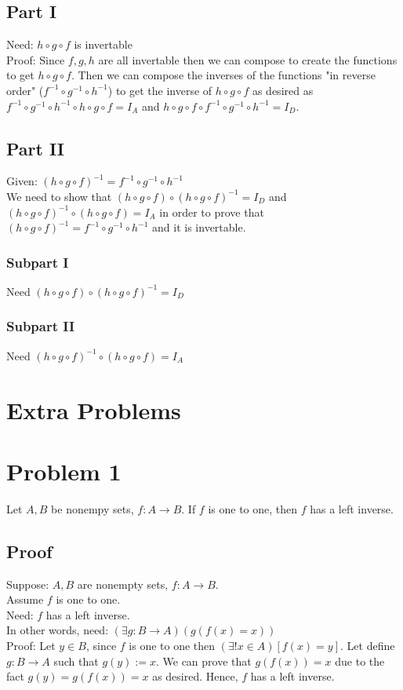\documentclass{article}
\begin{document}
\subsection*{Part I}
Need: $h \circ g \circ f$ is invertable\\
Proof: Since $f, g, h$ are all invertable then we can compose to create the functions to get $h \circ g \circ f$. Then we can compose the inverses of the functions "in reverse order" ($f^{-1} \circ g^{-1} \circ h^{-1}$) to get the inverse of $h \circ g \circ f$ as desired as $f^{-1} \circ g^{-1} \circ h^{-1} \circ h \circ g \circ f = I_A$ and $h \circ g \circ f \circ f^{-1} \circ g^{-1} \circ h^{-1} = I_D$.
\subsection*{Part II}
Given: $(h \circ g \circ f)^{-1} = f^{-1} \circ g^{-1} \circ h^{-1}$\\
We need to show that $(h \circ g \circ f) \circ (h \circ g \circ f)^{-1} = I_D$ and $(h \circ g \circ f)^{-1} \circ (h \circ g \circ f) = I_A$ in order to prove that $(h \circ g \circ f)^{-1} = f^{-1} \circ g^{-1} \circ h^{-1}$ and it is invertable.

\subsubsection*{Subpart I}
Need $(h \circ g \circ f) \circ (h \circ g \circ f)^{-1} = I_D$\\

\subsubsection*{Subpart II}
Need $(h \circ g \circ f)^{-1} \circ (h \circ g \circ f) = I_A$\\




\section*{Extra Problems}
\section*{Problem 1}
Let $A,B$ be nonempy sets, $f:A \rightarrow B$. If $f$ is one to one, then $f$ has a left inverse.
\subsection*{Proof}
Suppose: $A, B$ are nonempty sets, $f: A \rightarrow B$.\\
Assume $f$ is one to one.\\
Need: $f$ has a left inverse.\\
In other words, need: $(\exists g: B \rightarrow A)(g(f(x) = x))$\\
Proof: 
Let $y \in B$, since $f$ is one to one then $(\exists ! x \in A)[f(x) = y]$. Let define $g: B \rightarrow A$ such that $g(y) := x$. We can prove that $g(f(x))=x$ due to the fact $g(y) = g(f(x)) = x$ as desired. Hence, $f$ has a left inverse.
\end{document}
